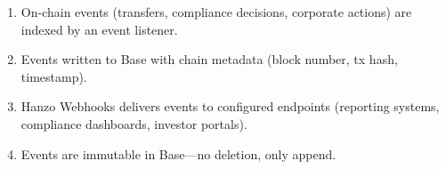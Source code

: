 \begin{enumerate}[leftmargin=1.4em]
    \item On-chain events (transfers, compliance decisions, corporate
    actions) are indexed by an event listener.
    \item Events written to Base with chain metadata (block number,
    tx hash, timestamp).
    \item Hanzo Webhooks delivers events to configured endpoints
    (reporting systems, compliance dashboards, investor portals).
    \item Events are immutable in Base---no deletion, only append.
\end{enumerate}

